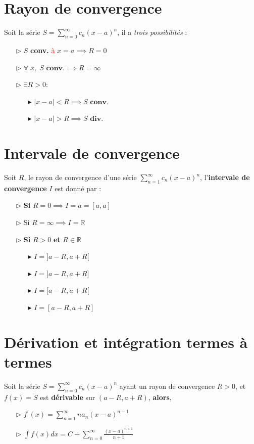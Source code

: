 \documentclass{report}
\begin{document}
\begin{multicols*}{3}
  \section{Rayon de convergence}
  Soit la série $S = \sum_{n=0}^{\infty }c_n(x - a)^n$, il a 
  \textit{trois possibilités} :   
  \begin{itemize}
    \item [$\rhd$ ] $S$ \textbf{conv.} \textcolor{red}{à}   
           $x = a \implies  R = 0$  
    \item [$\rhd$ ] $\forall \; x, \; S \textbf{ conv.} \implies  
                 R = \infty$       
    \item [$\rhd$ ] $\exists R > 0 \colon $ 
        \begin{itemize}
          \item [$\blacktriangleright$ ] $|x - a| < R \implies 
            S \textbf{ conv.}  $ 
          \item [$\blacktriangleright$ ] $|x - a| > R \implies 
            S \textbf{ div.}$ 
        \end{itemize}
  \end{itemize}

  \section{Intervale de convergence}
  Soit $R$, le rayon de convergence d'une série 
  $\sum_{n=1}^{\infty }c_n(x - a)^n$,  
  l'\textbf{intervale de convergence} $I$ est donné par : 
  \begin{itemize}
    \item [$\rhd$ ]\textbf{Si}  $R = 0 \implies  I = a = [a, a]$
    \item [$\rhd$ ] Si $R = \infty \implies  I = \mathbb{R} $
    \item [$\rhd$ ] \textbf{Si} $R > 0$ \textbf{et} $R \in \mathbb{R}$    
      \begin{itemize}
        \item [$\blacktriangleright$ ] $I = ]a - R, a + R[$
        \item [$\blacktriangleright$ ] $I = ]a - R, a + R]$
        \item [$\blacktriangleright$ ] $I = [ a - R, a + R[$
        \item [$\blacktriangleright$ ] $I = [ a - R, a + R] $
      \end{itemize}
  \end{itemize}

  \section{Dérivation et intégration termes à termes}
  Soit la série $S = \sum_{n=0}^{\infty }c_n(x - a)^n$ 
  ayant un rayon de convergence $R > 0$, et $f(x) = S$ est 
  \textbf{dérivable} sur $(a-R, a + R)$, \textbf{alors},     
  \begin{itemize}
    \item [$\rhd$ ] $f^{\prime}(x) = \sum_{n=1}^{\infty }na_n(x-a)^{n-1}$ 
    \item [$\rhd$ ] $\int f(x) dx = 
           C + \sum_{n=0}^{\infty }\frac{(x-a)^{n+1}}{n+1}$
  \end{itemize}


\end{multicols*}
\end{document}
